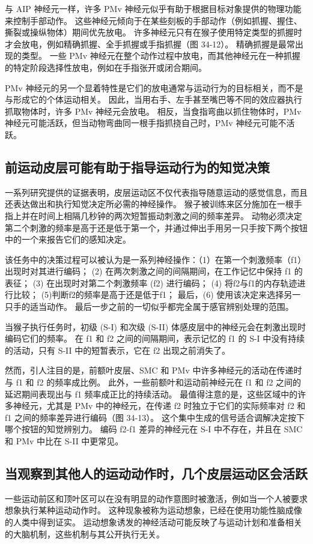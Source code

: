 与 AIP 神经元一样，许多 PMv 神经元似乎有助于根据目标对象提供的物理功能来控制手部动作。 这些神经元倾向于在某些刻板的手部动作（例如抓握、握住、撕裂或操纵物体）期间优先放电。 许多神经元只有在猴子使用特定类型的抓握时才会放电，例如精确抓握、全手抓握或手指抓握（图 34-12）。 精确抓握是最常出现的类型。 一些 PMv 神经元在整个动作过程中放电，而其他神经元在一种抓握的特定阶段选择性放电，例如在手指张开或闭合期间。

PMv 神经元的另一个显着特性是它们的放电通常与运动行为的目标相关，而不是与形成它的个体运动相关。 因此，当用右手、左手甚至嘴巴等不同的效应器执行抓取物体时，许多 PMv 神经元会放电。 相反，当食指弯曲以抓住物体时，PMv 神经元可能活跃，但当动物弯曲同一根手指抓挠自己时，PMv 神经元可能不活跃。


\subsection{前运动皮层可能有助于指导运动行为的知觉决策}
一系列研究提供的证据表明，皮层运动区不仅代表指导随意运动的感觉信息，而且还表达做出和执行知觉决定所必需的神经操作。 猴子被训练来区分施加在一根手指上并在时间上相隔几秒钟的两次短暂振动刺激之间的频率差异。 动物必须决定第二个刺激的频率是高于还是低于第一个，并通过伸出手用另一只手按下两个按钮中的一个来报告它们的感知决定。

该任务中的决策过程可以被认为是一系列神经操作：（1）在第一个刺激频率（f1）出现时对其进行编码； (2) 在两次刺激之间的间隔期间，在工作记忆中保持 f1 的表征； (3) 在出现时对第二个刺激频率 (f2) 进行编码； (4) 将f2与f1的内存轨迹进行比较； (5)判断f2的频率是高于还是低于f1； 最后，(6) 使用该决定来选择另一只手的适当动作。 最后一步之前的一切似乎都完全属于感官辨别处理的范围。

当猴子执行任务时，初级 (S-I) 和次级 (S-II) 体感皮层中的神经元会在刺激出现时编码它们的频率。 在 f1 和 f2 之间的间隔期间，表示记忆的 f1 的 S-I 中没有持续的活动，只有 S-II 中的短暂表示，它在 f2 出现之前消失了。

然而，引人注目的是，前额叶皮层、SMC 和 PMv 中许多神经元的活动在传递时与 f1 和 f2 的频率成比例。 此外，一些前额叶和运动前神经元在 f1 和 f2 之间的延迟期间表现出与 f1 频率成正比的持续活动。 最值得注意的是，这些区域中的许多神经元，尤其是 PMv 中的神经元，在传递 f2 时独立于它们的实际频率对 f2 和 f1 之间的频率差异进行编码（图 34-13）。 这个集中生成的信号适合调解决定按下哪个按钮的知觉辨别力。 编码 f2-f1 差异的神经元在 S-I 中不存在，并且在 SMC 和 PMv 中比在 S-II 中更常见。


\subsection{当观察到其他人的运动动作时，几个皮层运动区会活跃}
一些运动前区和顶叶区可以在没有明显的动作意图时被激活，例如当一个人被要求想象执行某种运动动作时。 这种现象被称为运动想象，已经在使用功能性脑成像的人类中得到证实。 运动想象诱发的神经活动可能反映了与运动计划和准备相关的大脑机制，这些机制与其公开执行无关。

